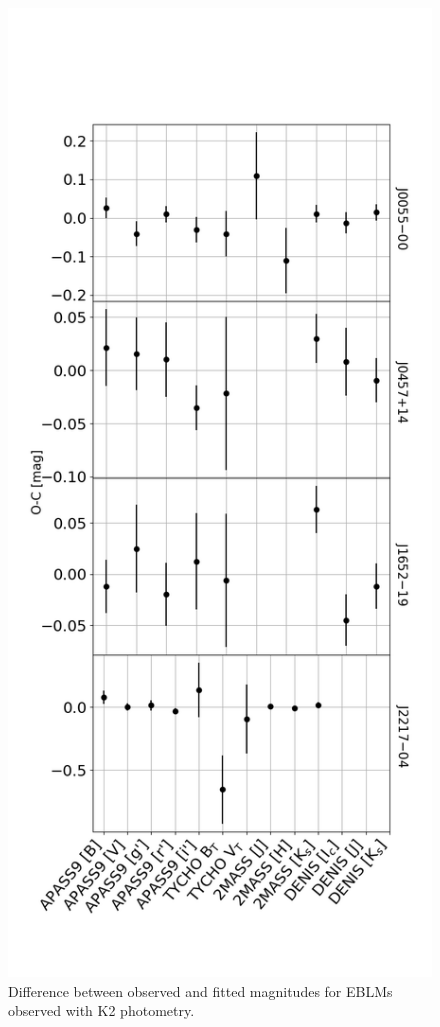 \begin{figure}
    \centering
    \includegraphics[scale=0.5]{Appendix/SED_fits/SED_residuals_ground.png}
    \caption{Difference between observed and fitted magnitudes for EBLMs observed with K2 photometry.}
    \label{fig:SED_residuals_K2}
\end{figure}
